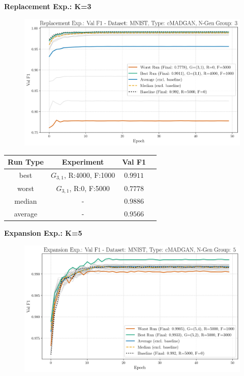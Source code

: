 \noindent\textbf{Replacement Exp.: K=3}
\begin{figure}[htbp]
	\centering
	\includegraphics[width=.85\textwidth]{abb/strat_classifier_performance/MNIST_STRATIFIED_CLASSIFIERS_cMADGAN_NEW/replacement_experiments/val_f1_score_cMADGAN_MNIST_n_gen_3_all.png}
	\label{fig:app_strat_class_performance_replacement_exp._val_f1_score_3}
\end{figure}
\begin{table}[H]
	\vspace{-1em}
	\centering
	\begin{tabular}{|c|c|c|c|}
		\hline
		Run Type & Experiment & Val F1 \\ \hline
		best & \(G_{3, 1}\), R:4000, F:1000 & $0.9911$\\ \hline
		worst & \(G_{3, 1}\), R:0, F:5000 & $0.7778$\\ \hline
		median & - & $0.9886$\\ \hline
		average & - & $0.9566$
		\\ \hline
	\end{tabular}
\end{table}
\newpage
\noindent\textbf{Expansion Exp.: K=5}
\begin{figure}[htbp]
	\centering
	\includegraphics[width=.85\textwidth]{abb/strat_classifier_performance/MNIST_STRATIFIED_CLASSIFIERS_cMADGAN_NEW/expansion_experiments/val_f1_score_cMADGAN_MNIST_n_gen_5_all.png}
	\label{fig:app_strat_class_performance_expansion_exp._val_f1_score_5}
\end{figure}
